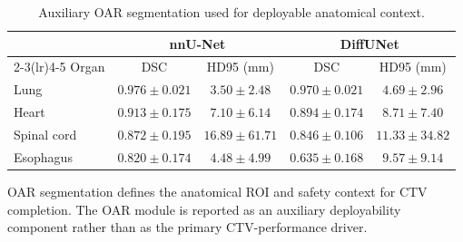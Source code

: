 \begin{table}[t]
\centering
\caption{Auxiliary OAR segmentation used for deployable anatomical context.}
\label{tab:oar-context-results}
\begin{threeparttable}
\begin{tabular}{@{}lcccc@{}}
\toprule
 & \multicolumn{2}{c}{nnU-Net} & \multicolumn{2}{c}{DiffUNet} \\
\cmidrule(lr){2-3}\cmidrule(lr){4-5}
Organ & DSC & HD95 (mm) & DSC & HD95 (mm) \\
\midrule
Lung & $0.976 \pm 0.021$ & $3.50 \pm 2.48$ & $0.970 \pm 0.021$ & $4.69 \pm 2.96$ \\
Heart & $0.913 \pm 0.175$ & $7.10 \pm 6.14$ & $0.894 \pm 0.174$ & $8.71 \pm 7.40$ \\
Spinal cord & $0.872 \pm 0.195$ & $16.89 \pm 61.71$ & $0.846 \pm 0.106$ & $11.33 \pm 34.82$ \\
Esophagus & $0.820 \pm 0.174$ & $4.48 \pm 4.99$ & $0.635 \pm 0.168$ & $9.57 \pm 9.14$ \\
\bottomrule
\end{tabular}
\begin{tablenotes}[flushleft]\footnotesize
\item OAR segmentation defines the anatomical ROI and safety context for CTV completion. The OAR module is reported as an auxiliary deployability component rather than as the primary CTV-performance driver.
\end{tablenotes}
\end{threeparttable}
\end{table}
